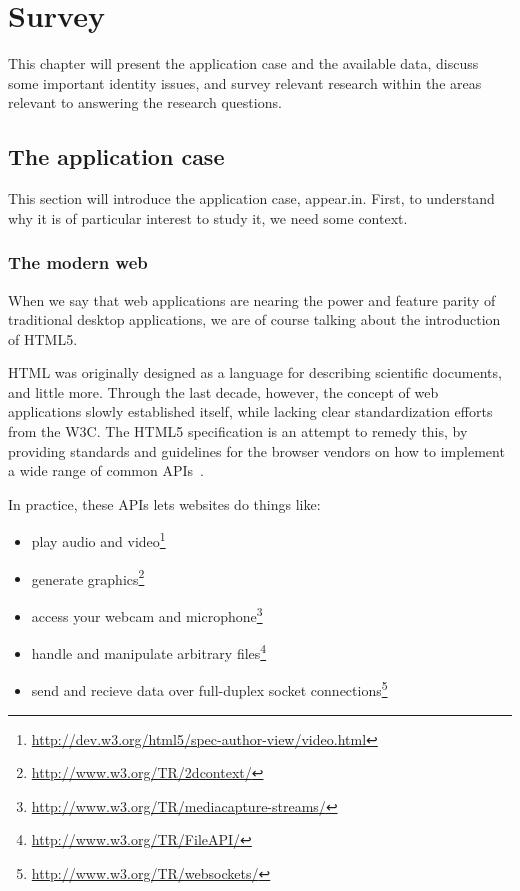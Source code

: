 \chapter{Survey}

\label{Chapter2}


This chapter will present the application case and the available data, discuss some important identity issues, and survey relevant research within the areas relevant to answering the research questions.

\section{The application case}
\label{survey:application_case}

  This section will introduce the application case, appear.in. First, to understand why it is of particular interest to study it, we need some context.

  \subsection{The modern web}
  \label{survey:the_modern_web}

    When we say that web applications are nearing the power and feature parity of traditional desktop applications, we are of course talking about the introduction of HTML5.

    HTML was originally designed as a language for describing scientific documents, and little more. Through the last decade, however, the concept of web applications slowly established itself, while lacking clear standardization efforts from the W3C. The HTML5 specification is an attempt to remedy this, by providing standards and guidelines for the browser vendors on how to implement a wide range of common APIs~\cite{W3CHTML5_intro}.

    In practice, these APIs lets websites do things like:

    \begin{itemize}
        \item play audio and video\footnote{\url{http://dev.w3.org/html5/spec-author-view/video.html}}
        \item generate graphics\footnote{\url{http://www.w3.org/TR/2dcontext/}}
        \item access your webcam and microphone\footnote{\url{http://www.w3.org/TR/mediacapture-streams/}}
        \item handle and manipulate arbitrary files\footnote{\url{http://www.w3.org/TR/FileAPI/}}
        \item send and recieve data over full-duplex socket connections\footnote{\url{http://www.w3.org/TR/websockets/}}
    \end{itemize}

